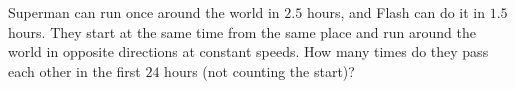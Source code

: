 Superman can run once around the world in $2.5$ hours, and Flash can do it in $1.5$ hours. They start at the same time from the same place and run around the world in opposite directions at constant speeds. How many times do they pass each other in the first $24$ hours (not counting the start)?
